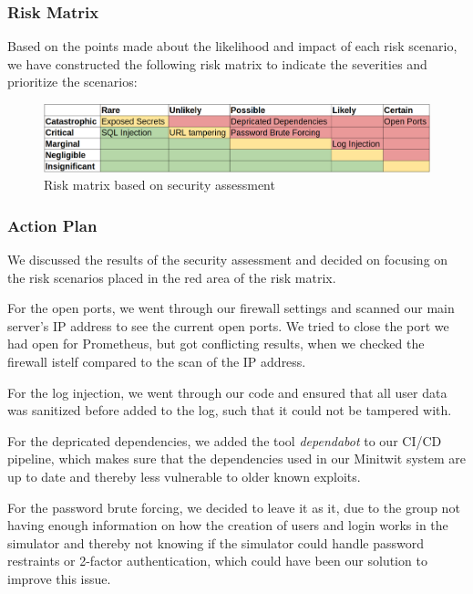 \subsubsection{Risk Matrix}
Based on the points made about the likelihood and impact of each risk scenario, we have constructed the following risk matrix to indicate the severities and prioritize the scenarios:
\begin{figure}[H]
    \centering
    \includegraphics[width=1\linewidth]{images/risk-matrix.png}
    \caption{Risk matrix based on security assessment}
    \label{fig:enter-label}
\end{figure}
\subsubsection{Action Plan}
We discussed the results of the security assessment and decided on focusing on the risk scenarios placed in the red area of the risk matrix.

For the open ports, we went through our firewall settings and scanned our main server's IP address to see the current open ports. We tried to close the port we had open for Prometheus, but got conflicting results, when we checked the firewall istelf compared to the scan of the IP address.

For the log injection, we went through our code and ensured that all user data was sanitized before added to the log, such that it could not be tampered with.

For the depricated dependencies, we added the tool \textit{dependabot} to our CI/CD pipeline, which makes sure that the dependencies used in our Minitwit system are up to date and thereby less vulnerable to older known exploits.

For the password brute forcing, we decided to leave it as it, due to the group not having enough information on how the creation of users and login works in the simulator and thereby not knowing if the simulator could handle password restraints or 2-factor authentication, which could have been our solution to improve this issue.
